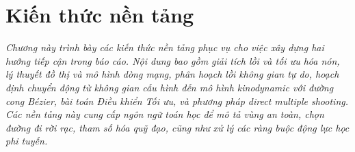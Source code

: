 \chapter{Kiến thức nền tảng}
\textit{
Chương này trình bày các kiến thức nền tảng phục vụ cho việc xây dựng hai hướng tiếp cận trong báo
cáo. Nội dung bao gồm giải tích lồi và tối ưu hóa nón, lý thuyết đồ thị và mô hình dòng mạng, phân
hoạch lồi không gian tự do, hoạch định chuyển động từ không gian cấu hình đến mô hình kinodynamic
với đường cong Bézier, bài toán Điều khiển Tối ưu, và phương pháp direct multiple shooting. Các nền
tảng này cung cấp ngôn ngữ toán học để mô tả vùng an toàn, chọn đường đi rời rạc, tham số hóa quỹ
đạo, cũng như xử lý các ràng buộc động lực học phi tuyến.
}








